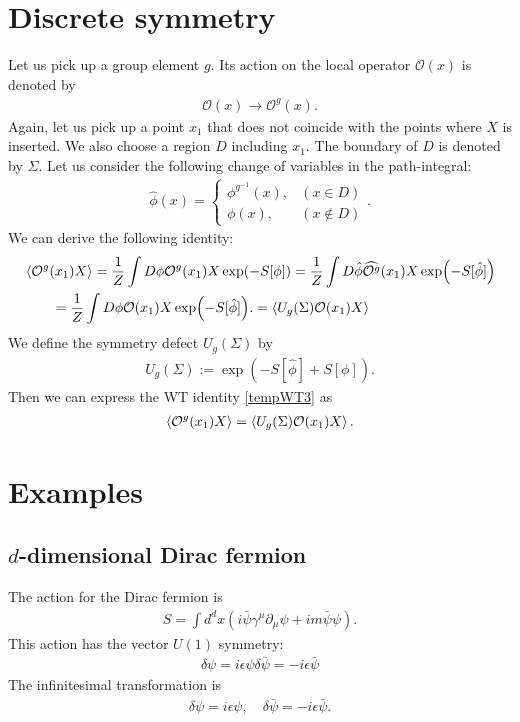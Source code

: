 \documentclass[12pt]{scrartcl}
\newcommand{\del}{\partial}
\newcommand{\Ocal}{\mathcal{O}}
\newcommand{\phih}{\hat{\phi}}
\newcommand{\psib}{\bar{\psi}}
\begin{document}
\section{Discrete symmetry}
Let us pick up a group element $g$. Its action on the local operator $\Ocal(x)$ is denoted by
\begin{align}
    \Ocal(x)\to \Ocal^g(x).
\end{align}
Again, let us pick up a point $x_1$ that does not coincide with the points where $X$ is inserted.  We also choose a region $D$ including $x_1$.  The boundary of $D$ is denoted by $\Sigma$.  Let us consider the following change of variables in the path-integral:
\begin{align}
    \phih(x)=
    \begin{cases}
        \phi^{g^{-1}}(x),& (x\in D)\\
        \phi(x),& (x\notin D)
    \end{cases}.
\end{align}
We can derive the following identity:
\begin{align}
    &\expval{\Ocal^{g}(x_1) X}
    =\frac{1}{Z}\int D\phi \Ocal^{g}(x_1) X \exp(-S[\phi])
    =\frac{1}{Z}\int D\phih \widehat{\Ocal^{g}}(x_1) X \exp(-S[\phih])\nonumber\\    
    &\qquad =\frac{1}{Z}\int D\phi \Ocal(x_1) X \exp(-S[\phih]).
    \label{tempWT3}
    =\expval{U_{g}(\Sigma)\Ocal(x_1)X}
\end{align}
We define the symmetry defect $U_{g}(\Sigma)$ by
\begin{align}
    U_{g}(\Sigma):=\exp(-S[\phih]+S[\phi]).\label{symmetryoperator}
\end{align}
Then we can express the WT identity \eqref{tempWT3} as
\begin{align}
    \expval{\Ocal^{g}(x_1)X}
    =\expval{U_{g}(\Sigma)\Ocal(x_1)X}.
\end{align}

\section{Examples}
\subsection{$d$-dimensional Dirac fermion}
The action for the Dirac fermion is
\begin{align}
    S=\int d^d x \left(i \psib \gamma^{\mu}\del_{\mu}\psi+im \psib\psi\right).
\end{align}
This action has the vector $U(1)$ symmetry:
\begin{align}
    \delta \psi=i\epsilon \psi
    \delta \psib=-i\epsilon \psib
\end{align}
The infinitesimal transformation is
\begin{align}
    \delta\psi=i\epsilon\psi,\quad 
    \delta\psib=-i\epsilon\psib.
\end{align}
\end{document}
